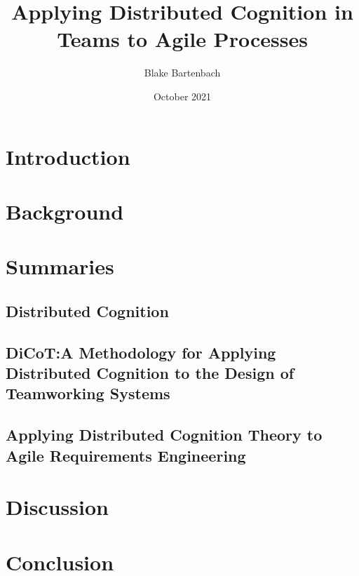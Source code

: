 \documentclass[acmsmall,screen]{acmart}
\begin{document}
\title{Applying Distributed Cognition in Teams to Agile Processes}

\author{Blake Bartenbach}
\date{October 2021}

\acmBooktitle{}

\begin{abstract}
  
\end{abstract}

\maketitle

\section{Introduction}


\section{Background}


\section{Summaries}
\subsection{Distributed Cognition}


\subsection{DiCoT:\@ A Methodology for Applying Distributed Cognition to the Design of Teamworking Systems}


\subsection{Applying Distributed Cognition Theory to Agile Requirements Engineering}


\section{Discussion}



\section{Conclusion}




\end{document}
